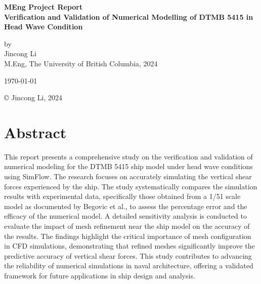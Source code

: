 \documentclass[12pt]{article} %
\begin{document}
\setlength{\parskip}{1em} 
\setlength{\parindent}{0pt}
\newcommand{\vect}[1]{\mathbf{#1}}

\begin{titlepage}  %
    \centering    %

    \vspace*{2cm}
    
    \normalsize \textbf{MEng Project Report} \\
    \vspace{0.5cm}  %
    \normalsize\textbf{Verification and Validation of Numerical Modelling of DTMB 5415 in Head Wave Condition} \\
    \vspace{2cm}  %
    
    \normalsize by\\
    \vspace{1cm}
    \normalsize Jincong Li \\ 
    \vspace{1cm}
    \normalsize M.Eng, The University of British Columbia, 2024
    \vspace{11cm}  %
    
    \normalsize \today

    \vfill  %
    © Jincong Li, 2024
\end{titlepage}
\tableofcontents
\newpage
\section*{Abstract}
This report presents a comprehensive study on the verification and validation of numerical modeling 
for the DTMB 5415 ship model under head wave conditions using SimFlow. The research focuses on 
accurately simulating the vertical shear forces experienced by the ship. The study systematically 
compares the simulation results with experimental data, specifically those obtained from a 1/51 scale model 
as documented by Begovic et al., 
to assess the percentage error and the efficacy of the numerical model. A detailed sensitivity analysis 
is conducted to evaluate the impact of mesh refinement near the ship model on the accuracy of the results. 
The findings highlight the critical importance of mesh configuration in CFD simulations, demonstrating 
that refined meshes significantly improve the predictive accuracy of vertical shear forces. 
This study contributes to advancing the reliability of numerical simulations in naval architecture,
offering a validated framework for future applications in ship design and analysis.
\end{document}
